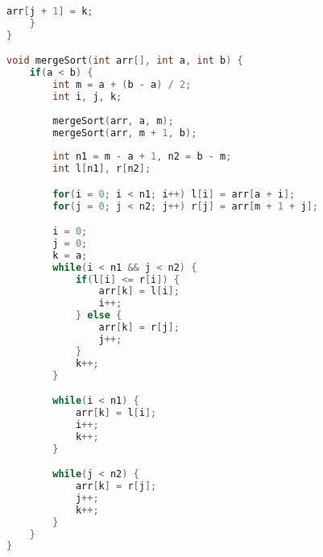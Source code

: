 \documentclass[letterpaper, 11pt]{article}
\begin{document}
\begin{lstlisting}[language=c++, caption=main.cpp]
        arr[j + 1] = k;
    }
}

void mergeSort(int arr[], int a, int b) {
    if(a < b) {
        int m = a + (b - a) / 2;
        int i, j, k;
        
        mergeSort(arr, a, m);
        mergeSort(arr, m + 1, b);
        
        int n1 = m - a + 1, n2 = b - m;
        int l[n1], r[n2];

        for(i = 0; i < n1; i++) l[i] = arr[a + i];
        for(j = 0; j < n2; j++) r[j] = arr[m + 1 + j];

        i = 0;
        j = 0;
        k = a;
        while(i < n1 && j < n2) {
            if(l[i] <= r[i]) {
                arr[k] = l[i];
                i++;
            } else {
                arr[k] = r[j];
                j++;
            }
            k++;
        }

        while(i < n1) {
            arr[k] = l[i];
            i++;
            k++;
        }

        while(j < n2) {
            arr[k] = r[j];
            j++;
            k++;
        }
    }
}    
\end{lstlisting}
\end{document}
